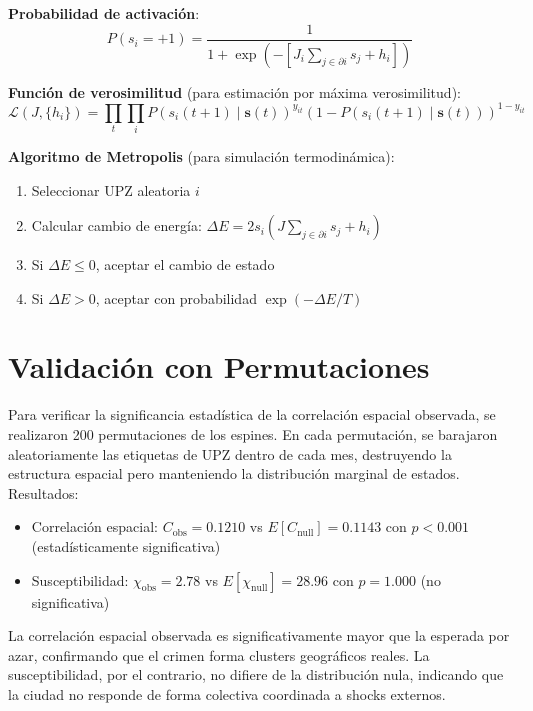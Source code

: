 \documentclass[12pt,a4paper]{article}
\begin{document}
\textbf{Probabilidad de activación}:
\begin{equation}
P(s_i=+1) = \frac{1}{1 + \exp\left(-\left[J_i \sum_{j \in \partial i} s_j + h_i\right]\right)}
\end{equation}

\textbf{Función de verosimilitud} (para estimación por máxima verosimilitud):
\begin{equation}
\mathcal{L}(J, \{h_i\}) = \prod_{t} \prod_{i} P(s_i(t+1) \mid \mathbf{s}(t))^{y_{it}} (1 - P(s_i(t+1) \mid \mathbf{s}(t)))^{1-y_{it}}
\end{equation}

\textbf{Algoritmo de Metropolis} (para simulación termodinámica):
\begin{enumerate}
    \item Seleccionar UPZ aleatoria $i$
    \item Calcular cambio de energía: $\Delta E = 2s_i\left(J\sum_{j \in \partial i} s_j + h_i\right)$
    \item Si $\Delta E \leq 0$, aceptar el cambio de estado
    \item Si $\Delta E > 0$, aceptar con probabilidad $\exp(-\Delta E / T)$
\end{enumerate}

\section{Validación con Permutaciones}

Para verificar la significancia estadística de la correlación espacial observada, se realizaron 200 permutaciones de los espines. En cada permutación, se barajaron aleatoriamente las etiquetas de UPZ dentro de cada mes, destruyendo la estructura espacial pero manteniendo la distribución marginal de estados. Resultados:
\begin{itemize}
    \item Correlación espacial: $C_{\text{obs}} = 0.1210$ vs $E[C_{\text{null}}] = 0.1143$ con $p < 0.001$ (estadísticamente significativa)
    \item Susceptibilidad: $\chi_{\text{obs}} = 2.78$ vs $E[\chi_{\text{null}}] = 28.96$ con $p = 1.000$ (no significativa)
\end{itemize}

La correlación espacial observada es significativamente mayor que la esperada por azar, confirmando que el crimen forma clusters geográficos reales. La susceptibilidad, por el contrario, no difiere de la distribución nula, indicando que la ciudad no responde de forma colectiva coordinada a shocks externos.
\end{document}
